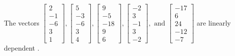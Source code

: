 \begin{exercise}
\begin{exerciseStatement}
  \end{exerciseStatement}
  \begin{exerciseAnswer}
   The vectors \(\left[\begin{array}{r}
2 \\
-1 \\
-6 \\
3 \\
1
\end{array}\right] , \left[\begin{array}{r}
5 \\
-3 \\
-6 \\
3 \\
4
\end{array}\right] , \left[\begin{array}{r}
9 \\
-5 \\
-18 \\
9 \\
6
\end{array}\right] , \left[\begin{array}{r}
-2 \\
3 \\
-1 \\
3 \\
-2
\end{array}\right] , \text{ and } \left[\begin{array}{r}
-17 \\
6 \\
24 \\
-12 \\
-7
\end{array}\right]\) are 
  	 linearly dependent  .
  


  \end{exerciseAnswer}
\end{exercise}